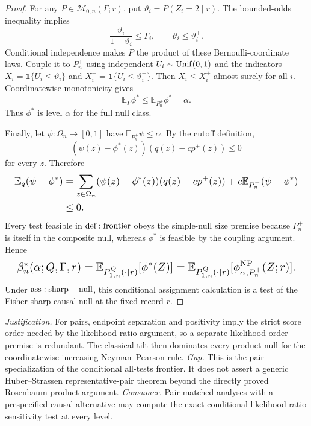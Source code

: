 \documentclass{article}
\begin{document}
\begin{proof}
For any \(P\in\mathcal M_{0,n}(\Gamma;r)\), put \(\vartheta_i=P(Z_i=2\mid r)\). The bounded-odds inequality implies
\[
 \frac{\vartheta_i}{1-\vartheta_i}\leq\Gamma_i,
 \qquad \vartheta_i\leq\vartheta_i^+.
\]
Conditional independence makes \(P\) the product of these Bernoulli-coordinate laws. Couple it to \(P_n^+\) using independent \(U_i\sim{\rm Unif}(0,1)\) and the indicators \(X_i=\mathbf1\{U_i\leq\vartheta_i\}\) and \(X_i^+=\mathbf1\{U_i\leq\vartheta_i^+\}\). Then \(X_i\leq X_i^+\) almost surely for all \(i\). Coordinatewise monotonicity gives
\[
 \mathbb E_P\phi^*\leq\mathbb E_{P_n^+}\phi^*=\alpha.
\]
Thus \(\phi^*\) is level \(\alpha\) for the full null class.

Finally, let \(\psi:\Omega_n\to[0,1]\) have \(\mathbb E_{P_n^+}\psi\leq\alpha\). By the cutoff definition,
\[
 (\psi(z)-\phi^*(z))(q(z)-cp^+(z))\leq0
\]
for every \(z\). Therefore
\[
\makebox[\linewidth][c]{\resizebox{0.98\linewidth}{!}{\(\displaystyle \begin{aligned}
 \mathbb E_q(\psi-\phi^*)
 &=\sum_{z\in\Omega_n}(\psi(z)-\phi^*(z))(q(z)-cp^+(z))+c\mathbb E_{P_n^+}(\psi-\phi^*)\\
 &\leq0.
 \end{aligned}\)}}
\]
Every test feasible in \({\rm def:frontier}\) obeys the simple-null size premise because \(P_n^+\) is itself in the composite null, whereas \(\phi^*\) is feasible by the coupling argument. Hence
\[
\makebox[\linewidth][c]{\resizebox{0.98\linewidth}{!}{\par\noindent \makebox[\linewidth][c]{\resizebox{0.98\linewidth}{!}{\(\displaystyle \displaystyle \beta_n^\star(\alpha;Q,\Gamma,r)=\mathbb E_{P_{1,n}^{Q}(\cdot\mid r)}[\phi^*(Z)]=\mathbb E_{P_{1,n}^{Q}(\cdot\mid r)}[\phi_{\alpha,P_n^+}^{\mathrm{NP}}(Z;r)].\)}}\par\noindent}}
\]
Under \({\rm ass:sharp-null}\), this conditional assignment calculation is a test of the Fisher sharp causal null at the fixed record \(r\).
\end{proof}
\par\smallskip\noindent \textit{Justification.} For pairs, endpoint separation and positivity imply the strict score order needed by the likelihood-ratio argument, so a separate likelihood-order premise is redundant. The classical tilt then dominates every product null for the coordinatewise increasing Neyman--Pearson rule. \textit{Gap.} This is the pair specialization of the conditional all-tests frontier. It does not assert a generic Huber--Strassen representative-pair theorem beyond the directly proved Rosenbaum product argument. \textit{Consumer.} Pair-matched analyses with a prespecified causal alternative may compute the exact conditional likelihood-ratio sensitivity test at every level.
\end{document}
